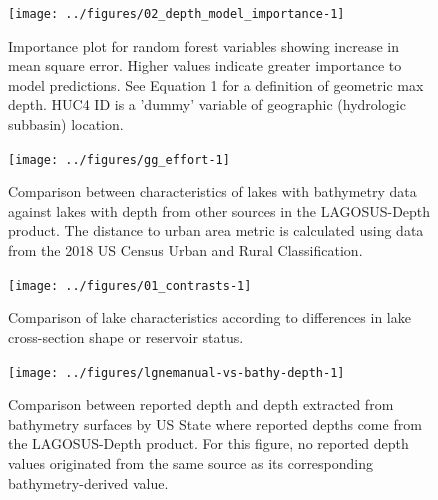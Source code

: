 \documentclass[draft,wrr]{agutexSI2019}
\begin{document}
\begin{figure}
      \noindent\texttt{[image: ../figures/02\_depth\_model\_importance-1]}
      \caption{Importance plot for random forest variables showing increase in mean square error. Higher values indicate greater importance to model predictions. See Equation 1 for a definition of geometric max depth. HUC4 ID is a 'dummy' variable of geographic (hydrologic subbasin) location.}\label{figS7}
      \end{figure}

\begin{figure}
      \begin{center}\texttt{[image: ../figures/gg\_effort-1]}\end{center}
            \caption{Comparison between characteristics of lakes with bathymetry data against lakes with depth from other sources in the LAGOSUS-Depth product. The distance to urban area metric is calculated using data from the 2018 US Census Urban and Rural Classification.}\label{figS8}
      \end{figure}

\clearpage
\begin{figure}
      \begin{center}\texttt{[image: ../figures/01\_contrasts-1]}\end{center}
      \caption{Comparison of lake characteristics according to differences in lake cross-section shape or reservoir status.}\label{figS9}
      \end{figure}

\clearpage

\begin{figure}
      \begin{center}\texttt{[image: ../figures/lgnemanual-vs-bathy-depth-1]}\end{center}
      \caption{Comparison between reported depth and depth extracted from bathymetry surfaces by US State where reported depths come from the LAGOSUS-Depth product. For this figure, no reported depth values originated from the same source as its corresponding bathymetry-derived value.}\label{figS10}
      \end{figure}

\clearpage
\end{document}
